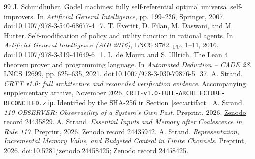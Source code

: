 \documentclass[10pt,letterpaper]{article}
\begin{document}
\begin{thebibliography}{99}
 J. Schmidhuber. G\"odel machines: fully self-referential optimal universal self-improvers. In \emph{Artificial General Intelligence}, pp. 199--226, Springer, 2007. \href{https://doi.org/10.1007/978-3-540-68677-4_7}{doi:10.1007/978-3-540-68677-4\_7}.
 T. Everitt, D. Filan, M. Daswani, and M. Hutter. Self-modification of policy and utility function in rational agents. In \emph{Artificial General Intelligence (AGI 2016)}, LNCS 9782, pp. 1--11, 2016. \href{https://doi.org/10.1007/978-3-319-41649-6_1}{doi:10.1007/978-3-319-41649-6\_1}.
 L. de Moura and S. Ullrich. The Lean 4 theorem prover and programming language. In \emph{Automated Deduction -- CADE 28}, LNCS 12699, pp. 625--635, 2021. \href{https://doi.org/10.1007/978-3-030-79876-5_37}{doi:10.1007/978-3-030-79876-5\_37}.
 A. Strand. \emph{CRTT v1.0: full architecture and reconciled verification evidence}. Accompanying supplementary archive, November 2026. \texttt{CRTT-v1.0-FULL-ARCHITECTURE-RECONCILED.zip}. Identified by the SHA-256 in Section~\ref{sec:artifact}.
 A. Strand. \emph{110 OBSERVER: Observability of a System's Own Past}. Preprint, 2026. \href{https://zenodo.org/records/24435829}{Zenodo record 24435829}.
 A. Strand. \emph{Essential Inputs and Memory after Coalescence in Rule 110}. Preprint, 2026. \href{https://zenodo.org/records/24435942}{Zenodo record 24435942}.
 A. Strand. \emph{Representation, Incremental Memory Value, and Budgeted Control in Finite Channels}. Preprint, 2026. \href{https://doi.org/10.5281/zenodo.24458425}{doi:10.5281/zenodo.24458425}; \href{https://zenodo.org/records/24458425}{Zenodo record 24458425}.
\end{thebibliography}
\end{document}
